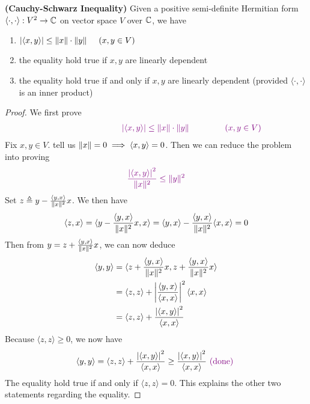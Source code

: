 \documentclass{report}
\begin{document}
\begin{theorem}
\label{CSI}
\textbf{(Cauchy-Schwarz Inequality)} Given a positive semi-definite Hermitian form $\langle \cdot,\cdot\rangle :V^2\rightarrow \mathbb{C}$ on vector space $V$ over $\mathbb{C}$, we have 
\begin{enumerate}[label=(\alph*)]
  \item $\left|\langle x,y\rangle\right|\leq  \| x \|\cdot\| y \|\hspace{0.5cm}(x,y \in V)$ 
  \item the equality hold true if $x,y$ are linearly dependent
  \item the equality hold true if and only if $x,y$ are linearly dependent (provided $\langle \cdot,\cdot\rangle $ is an inner product)
\end{enumerate}
\end{theorem}
\begin{proof}
We first prove 
\begin{align*}
  \vi{\hspace{3cm}\abso{\langle x,y\rangle }\leq \norm{x}\cdot\norm{y}\hspace{1.5cm}(x,y \in V)}
\end{align*}
Fix $x,y \in V$.  tell us $\| x \|=0 \implies  \langle x,y\rangle =0$. Then we can reduce the problem into proving 
\begin{align*}
\textcolor{violet}{\frac{\left|\langle x,y\rangle \right|^2}{\| x \|^2}\leq\| y \|^2  }
\end{align*}
Set $z\triangleq y-\frac{\langle y,x\rangle }{\| x \|^2}x$. We then have 
\begin{align*}
\langle z,x\rangle =\langle y-\frac{\langle y,x\rangle }{\| x \|^2}x,x \rangle =\langle y,x\rangle - \frac{\langle y,x\rangle }{\| x \|^2}\langle x,x\rangle =0
\end{align*}
Then from $y=z+\frac{\langle y,x\rangle }{\| x \|^2}x$, we can now deduce
\begin{align*}
\langle y,y\rangle &= \langle z+\frac{\langle y,x\rangle }{\| x \|^2}x,z+ \frac{\langle y,x\rangle }{\| x \|^2}x\rangle  \\
&=\langle z,z\rangle + \left|\frac{\langle y,x\rangle }{\langle x,x\rangle }\right|^2 \langle x,x\rangle \\
&=\langle z,z\rangle + \frac{\left|\langle x,y\rangle \right|^2}{\langle x,x\rangle }
\end{align*}
Because $\langle z,z\rangle\geq 0 $, we now have
\begin{align*}
\langle y,y\rangle = \langle z,z\rangle + \frac{\left|\langle x,y\rangle \right|^2}{\langle x,x\rangle }\geq  \frac{\left|\langle x,y\rangle \right|^2}{\langle x,x\rangle }\textcolor{violet}{\text{ (done) }}
\end{align*}
The equality hold true if and only if $\langle z,z\rangle =0$. This explains the other two statements regarding the equality. 
\end{proof}
\end{document}
